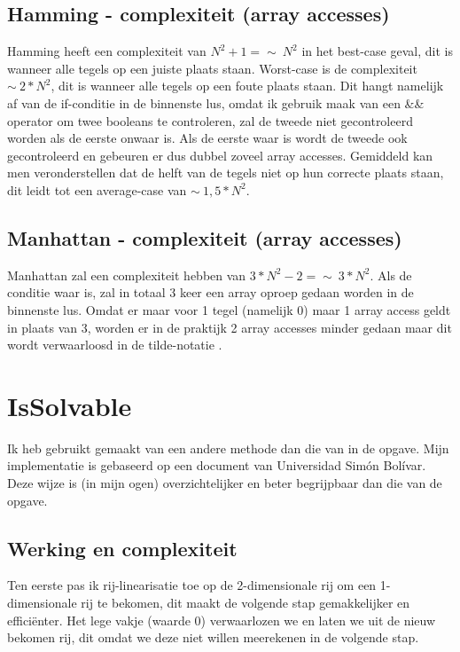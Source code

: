 \documentclass{article}
\begin{document}
\subsection{Hamming - complexiteit (array accesses)}
Hamming heeft een complexiteit van $N^2 + 1 = \sim\ N^2 $ in het best-case geval, dit is wanneer alle tegels op een juiste plaats staan. Worst-case is de complexiteit $ \sim\ 2 * N^2 $, dit is wanneer alle tegels op een foute plaats staan. Dit hangt namelijk af van de if-conditie in de binnenste lus, omdat ik gebruik maak van een \&\& operator om twee booleans te controleren, zal de tweede niet gecontroleerd worden als de eerste onwaar is. Als de eerste waar is wordt de tweede ook gecontroleerd en gebeuren er dus dubbel zoveel array accesses. Gemiddeld kan men veronderstellen dat de helft van de tegels niet op hun correcte plaats staan, dit leidt tot een average-case van $ \sim\ 1,5 * N^2 $.

\subsection{Manhattan - complexiteit (array accesses)}

Manhattan zal een complexiteit hebben van $3*N^2 - 2 = \sim\ 3*N^2 $. Als de conditie waar is, zal in totaal 3 keer een array oproep gedaan worden in de binnenste lus. Omdat er maar voor 1 tegel (namelijk 0) maar 1 array access geldt in plaats van 3, worden er in de praktijk 2 array accesses minder gedaan maar dit wordt verwaarloosd in de tilde-notatie .

\section{IsSolvable}

Ik heb gebruikt gemaakt van een andere methode dan die van in de opgave. Mijn implementatie is gebaseerd op een document van Universidad Sim\'{o}n Bol\'{i}var.\cite{isSolvable} Deze wijze is (in mijn ogen) overzichtelijker en beter begrijpbaar dan die van de opgave.

\subsection{Werking en complexiteit}
Ten eerste pas ik rij-linearisatie toe op de 2-dimensionale rij om een 1-dimensionale rij te bekomen, dit maakt de volgende stap gemakkelijker en effici\"{e}nter. Het lege vakje (waarde 0) verwaarlozen we en laten we uit de nieuw bekomen rij, dit omdat we deze niet willen meerekenen in de volgende stap.
\end{document}
